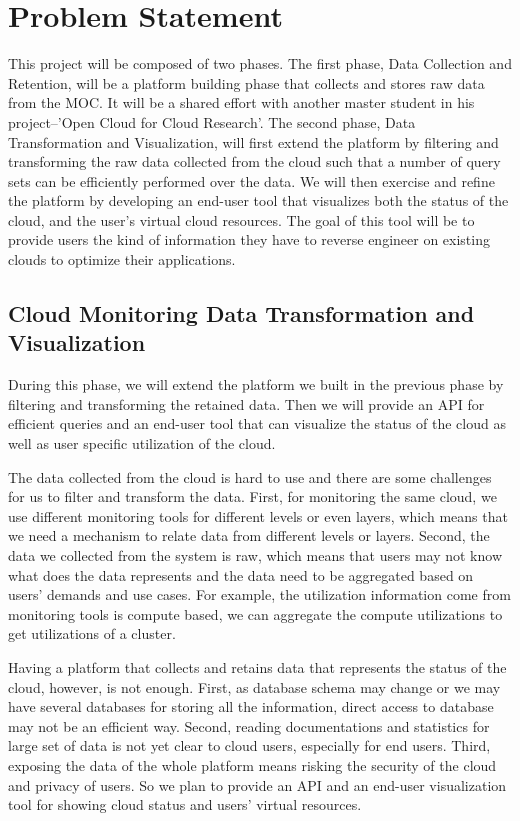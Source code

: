 \section{Problem Statement}
\label{sec:ProblemStatement}



This project will be composed of two phases. The first phase, Data Collection and Retention, will be a platform building phase that collects and stores raw data from the MOC. It will be a shared effort with another master student in his project--'Open Cloud for Cloud Research'.  
The second phase, Data Transformation and Visualization, will first extend the platform by filtering and transforming the raw data collected from the cloud such that a number of query sets can be efficiently performed over the data. We will then exercise and refine the platform by developing an end-user tool that visualizes both the status of the cloud, and the user’s virtual cloud resources. The goal of this tool will be to provide users the kind of information they have to reverse engineer on existing clouds to optimize their applications.



\subsection{Cloud Monitoring Data Transformation and Visualization}
During this phase, we will extend the platform we built in the previous phase by filtering and transforming the retained data. Then we will provide an API  for efficient queries and an end-user tool that can visualize the status of the cloud as well as user specific utilization of the cloud.  

The data collected from the cloud is hard to use and there are some challenges for us to filter and transform the data. First, for monitoring the same cloud, we use different monitoring tools for different levels or even layers, which means that we need a mechanism to relate data from different levels or layers. Second, the data we collected from the system is raw, which means that users may not know what does the data represents and the data need to be aggregated based on users’ demands and use cases. For example, the utilization information come from monitoring tools is compute based, we can aggregate the compute utilizations to get utilizations of a cluster. 

Having a platform that collects and retains data that represents the status of the cloud, however, is not enough. First, as database schema may change or we may have several databases for storing all the information, direct access to database may not be an efficient way. Second, reading documentations and statistics for large set of data is not yet clear to cloud users, especially for end users. Third, exposing the data of the whole platform means risking the security of the cloud and privacy of users. So we plan to provide an API and an end-user visualization tool for showing cloud status and users’ virtual resources. 